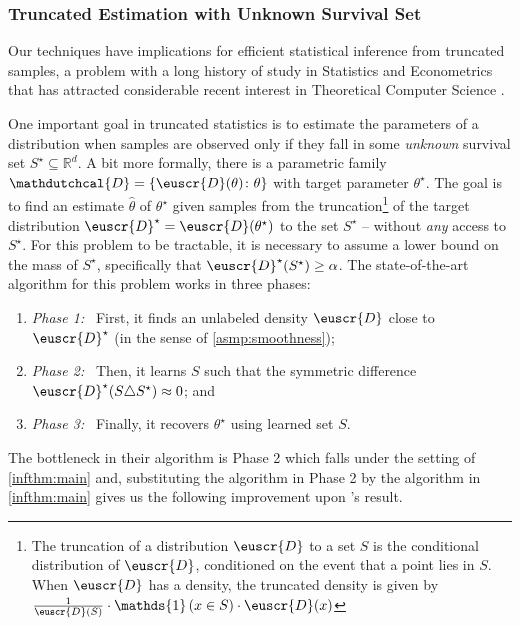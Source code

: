 \documentclass[11pt]{article}
\theoremstyle{plain}
\theoremstyle{definition}
\theoremstyle{remark}
\newcommand{\inbrace}[1]{\left\{#1\right\}}
\newcommand{\inparen}[1]{\left(#1\right)}
\newcommand{\R}{\mathbb{R}}
\newcommand\ind{\mathds{1}}
\newcommand{\wh}[1]{\widehat{#1}}
\newcommand{\customcal}[1]{\euscr{#1}}
\newcommand{\cD}{\customcal{D}}
\newcommand{\hypo}[1]{\mathdutchcal{#1}}
\newcommand{\hyD}{\hypo{D}}
\newcommand{\cDtrue}{\cD^\star}
\begin{document}
    \subsubsection{Truncated Estimation with Unknown Survival Set}\label{sec:intro:application:truncation}
        Our techniques have implications for efficient statistical inference from truncated samples, a problem with a long history of study in Statistics and Econometrics \cite{Galton1897,Pearson1902,PearsonLee1908,Lee1915,fisher31,maddala1983limited,Cohen91,hannon1999estimation,raschke2012inference} that has attracted considerable recent interest in Theoretical Computer Science \cite{daskalakis2018efficient, Kontonis2019EfficientTS, daskalakis2019computationally, trunc_regression_unknown_var, ons_switch_grad, lee2023learning, diakonikolas2024statistical,galanis2024discreteTruncated,lee2024unknown,nagarajan2020truncatedMixtureEM,fotakis2020booleanProductTruncated,nagarajan2023EMMixtureTruncation,tai2023mixtureCensored}.

        One important goal in truncated statistics is to estimate the parameters of a distribution when samples are observed only if they fall in some \textit{unknown} survival set $S^\star\subseteq\R^d$.
        A bit more formally, 
        there is a parametric family $\hyD=\inbrace{\cD(\theta)\colon \theta}$ with target parameter $\theta^\star$. 
        The goal is to find an estimate $\wh{\theta}$ of $\theta^\star$ given samples from the truncation\footnote{The truncation of a distribution $\cD$ to a set $S$ is the conditional distribution of $\cD$, conditioned on the event that a point lies in $S$. When $\cD$ has a density, the truncated density is given by $\frac{1}{\cD(S)} \cdot \ind\inparen{x \in S} \cdot \cD(x)$} of the target distribution $\cDtrue = \cD(\theta^\star)$ to the set $S^\star$ -- without \textit{any} access to $S^\star$.
        For this problem to be tractable, it is necessary to assume a lower bound on the mass of $S^\star$, specifically that $\cDtrue(S^\star)\geq \alpha$.
        The state-of-the-art algorithm for this problem \cite{lee2024unknown} works in three phases:
        \begin{enumerate}[itemsep=0pt]
            \item \textit{Phase 1:}~ First, it finds an unlabeled density $\cD$ close to $\cDtrue$ (in the sense of \cref{asmp:smoothness});
            \item \textit{Phase 2:}~ Then, it learns $S$ such that the symmetric difference $\cDtrue(S\triangle S^\star)\approx 0$; and 
            \item \textit{Phase 3:}~ Finally, it recovers $\theta^\star$ using  learned set $S$. 
        \end{enumerate}
        The bottleneck in their algorithm is Phase 2 which falls under the setting of \cref{infthm:main} and, substituting the algorithm in Phase 2 by the algorithm in \cref{infthm:main} gives us the following improvement upon \citet{lee2024unknown}'s result.
        
\end{document}
